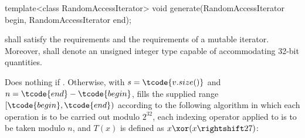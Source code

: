 %
\begin{itemdecl}
template<class RandomAccessIterator>
  void generate(RandomAccessIterator begin, RandomAccessIterator end);
\end{itemdecl}

\begin{itemdescr}
\pnum\requires {}
  shall satisfy the
   requirements
  and the requirements of a mutable iterator.
  Moreover,
  shall denote an unsigned integer type
  capable of accommodating 32-bit quantities.

\pnum\effects
 Does nothing if .
 Otherwise,
 with $s = \tcode{v.size()}$
 and  $n = \tcode{end} - \tcode{begin}$,
 fills the supplied range $[\tcode{begin},\tcode{end})$
 according to the following algorithm
 in which
 each operation is to be carried out modulo $2^{32}$,
 each indexing operator applied to  is to be taken modulo $n$,
 and $T(x)$ is defined as $x \xor (x \rightshift 27)$:


\end{itemdescr}
